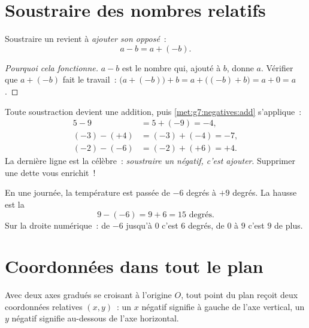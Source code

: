 \section{Soustraire des nombres relatifs}

\begin{theorem}\label{thm:g7:negatives:sub}
Soustraire un  revient à \emph{ajouter son opposé}~:
\[
a - b = a + (-b) .
\]
\end{theorem}

\begin{proof}[Pourquoi cela fonctionne]
$a - b$ est le nombre qui, ajouté à $b$, donne $a$. Vérifier que
$a + (-b)$ fait le travail~:
$\bigl(a + (-b)\bigr) + b = a + \bigl((-b) + b\bigr) = a + 0 = a$.
\end{proof}

\begin{example}\label{ex:g7:negatives:sub}
Toute soustraction devient une addition, puis
\cref{met:g7:negatives:add} s'applique~:
\begin{align*}
5 - 9 &= 5 + (-9) = -4, \\
(-3) - (+4) &= (-3) + (-4) = -7, \\
(-2) - (-6) &= (-2) + (+6) = +4 .
\end{align*}
La dernière ligne est la célèbre~: \emph{soustraire un négatif,
c'est ajouter}. Supprimer une dette vous enrichit~!
\end{example}

\begin{example}\label{ex:g7:negatives:temperature}
En une journée, la température est passée de $-6$ degrés à $+9$
degrés. La hausse est la 
\[
9 - (-6) = 9 + 6 = 15 \text{ degrés}.
\]
Sur la droite numérique~: de $-6$ jusqu'à $0$ c'est $6$ degrés, de
$0$ à $9$ c'est $9$ de plus.
\end{example}

\section{Coordonnées dans tout le plan}

\begin{definition}\label{def:g7:negatives:coords}
Avec deux axes gradués  se croisant à l'origine $O$,
tout point du plan reçoit deux coordonnées relatives $(x, y)$~: un
$x$ négatif signifie à gauche de l'axe vertical, un $y$ négatif
signifie au-dessous de l'axe horizontal.
\end{definition}

